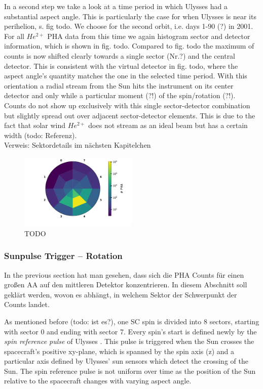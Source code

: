 In a second step we take a look at a time period in which Ulysses had a substantial aspect angle. This is particularly the case for when Ulysses is near its perihelion, s. fig todo. We choose for the second orbit, i.e. days 1-90 (?) in 2001. For all $He^{2+}$ PHA data from this time we again histogram sector and detector information, which is shown in fig. todo. Compared to fig. todo the maximum of counts is now shifted clearly towards a single sector (Nr.?) and the central detector. This is consistent with the virtual detector in fig. todo, where the aspect angle's quantity matches the one in the selected time period. With this orientation a radial stream from the Sun hits the instrument on its center detector and only while a particular moment (?!) of the spin/rotation (?!). Counts do not show up exclusively with this single sector-detector combination but slightly spread out over adjacent sector-detector elements. This is due to the fact that solar wind $He^{2+}$ does not stream as an ideal beam but has a certain width (todo: Referenz).
\\ Verweis: Sektordetails im nächsten Kapitelchen

\begin{figure}[h]
	\includegraphics[width=0.5\textwidth]{Figures/hist_det_sec_aa_90days2001}
	\centering
	\caption{TODO}
	\label{TODO}
\end{figure}


\subsubsection{Sunpulse Trigger -- Rotation}
In the previous section hat man gesehen, dass sich die PHA Counts für einen großen AA auf den mittleren Detektor konzentrieren. In diesem Abschnitt soll geklärt werden, wovon es abhängt, in welchem Sektor der Schwerpunkt der Counts landet. 

As mentioned before (todo: ist es?), one SC spin is divided into 8 sectors, starting with sector 0 and ending with sector 7.
Every spin's start is defined newly by the \textit{spin reference pulse} of Ulysses \citep{hiscale}. 
This pulse is triggered when the Sun crosses the spacecraft's positive xy-plane, which is spanned by the spin axis (z) and a particular axis defined by Ulysses' sun sensors which detect the crossing of the Sun.
The spin reference pulse is not uniform over time as the position of the Sun relative to the spacecraft changes with varying aspect angle.\\

